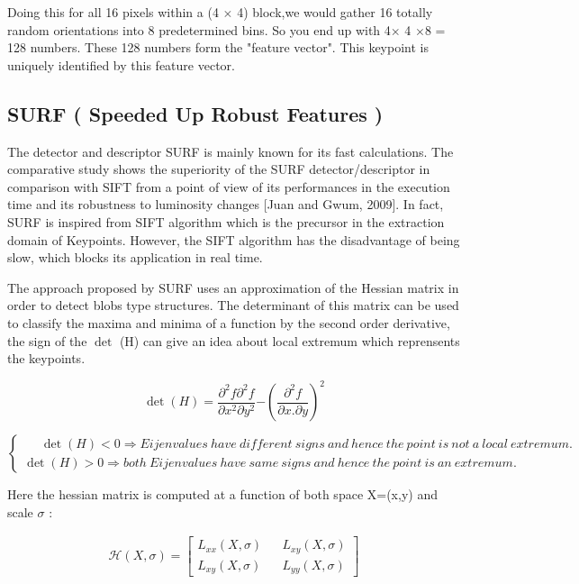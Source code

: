 Doing this for all 16 pixels within a (4 $\times$ 4) block,we  would gather  16 totally random orientations into 8 predetermined bins.  So you end up with 4$\times$ 4 $\times$8 = 128 numbers. These 128 numbers form the "feature vector". This keypoint is uniquely identified by this feature vector.



\subsection{ SURF ( Speeded Up Robust Features ) }\label{surf}

The detector and descriptor SURF is mainly known for its fast calculations. The comparative study shows the superiority of the SURF detector/descriptor in comparison with SIFT from a point of view of its performances in the execution time and its robustness to luminosity changes [Juan and Gwum, 2009]. In fact, SURF is inspired from SIFT algorithm which is the precursor in the extraction domain of Keypoints. However, the SIFT algorithm has the disadvantage of being slow, which blocks its application in real time.

The approach proposed by SURF uses an approximation of the Hessian matrix in order to detect blobs type structures.  The determinant  of this matrix  can be used to classify the maxima and minima of a function by the second order derivative,  the sign of the  $\det$ (H) can give an idea about local extremum which reprensents the keypoints.

$$ \det (H) =\frac{\partial^2 f \partial^2 f} {\partial x^2 {\partial y^2}}  \bm{-}  (\frac  {\partial^2 f}{\partial x.\partial y})^{2}$$


$
\left\{\begin{matrix}
\ \ \ \ \ \ \det(H) < 0 \Rightarrow  Eijenvalues\ have\ different\ signs\ and\ hence\ the\ point\ is\ not\ a\ local\ extremum.\\
\det(H) > 0 \Rightarrow  both\ Eijenvalues\ have\ same\ signs\ and\ hence\ the\ point\ is\ an\ extremum. 
\end{matrix}\right.
$


Here the hessian matrix is computed at a function of both space X=(x,y) and scale $\sigma$ :



\begin{gather}
 \mathcal{H}(X,\sigma) =
\begin{bmatrix}
                 {L_{xx}(X,\sigma)}  && {L_{xy}(X,\sigma)} \\
                 {L_{xy}(X,\sigma)} && {L_{yy}(X,\sigma)}
\end{bmatrix}
\end{gather}

